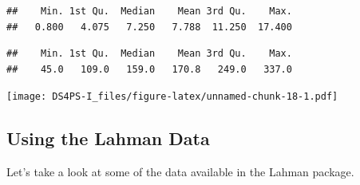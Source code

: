 \documentclass[]{book}
\newenvironment{Shaded}{\begin{snugshade}}{\end{snugshade}}
\newcommand{\CommentTok}[1]{\textcolor[rgb]{0.56,0.35,0.01}{\textit{#1}}}
\newcommand{\DataTypeTok}[1]{\textcolor[rgb]{0.13,0.29,0.53}{#1}}
\newcommand{\KeywordTok}[1]{\textcolor[rgb]{0.13,0.29,0.53}{\textbf{#1}}}
\newcommand{\NormalTok}[1]{#1}
\newcommand{\OperatorTok}[1]{\textcolor[rgb]{0.81,0.36,0.00}{\textbf{#1}}}
\newcommand{\StringTok}[1]{\textcolor[rgb]{0.31,0.60,0.02}{#1}}
\theoremstyle{definition}
\theoremstyle{definition}
\theoremstyle{definition}
\theoremstyle{remark}
\begin{document}
\begin{verbatim}
##    Min. 1st Qu.  Median    Mean 3rd Qu.    Max. 
##   0.800   4.075   7.250   7.788  11.250  17.400
\end{verbatim}

\begin{Shaded}
\end{Shaded}

\begin{verbatim}
##    Min. 1st Qu.  Median    Mean 3rd Qu.    Max. 
##    45.0   109.0   159.0   170.8   249.0   337.0
\end{verbatim}

\begin{Shaded}
\end{Shaded}

\texttt{[image: DS4PS-I\_files/figure-latex/unnamed-chunk-18-1.pdf]}

\hypertarget{using-the-lahman-data}{%
\subsection{Using the Lahman Data}\label{using-the-lahman-data}}

Let's take a look at some of the data available in the Lahman package.
\end{document}
